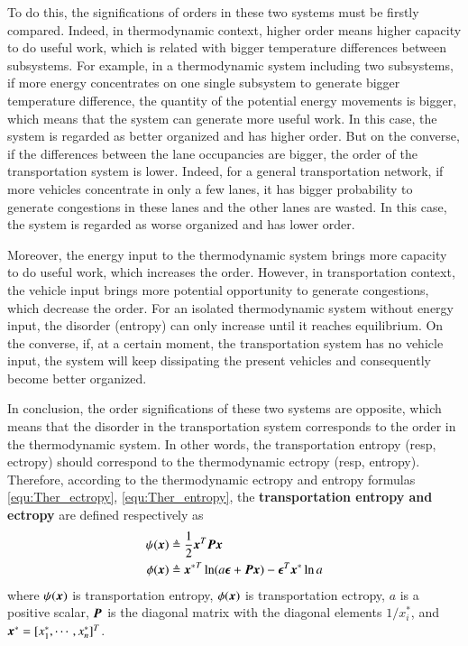 \documentclass[preprint,authoryear,12pt]{elsarticle}
\renewcommand{\vec}[1]{\mbox{\boldmath$#1$}}
\newcommand{\mat}[1]{\mbox{\boldmath$#1$}}
\begin{document}
To do this, the significations of orders in these two systems must be
firstly compared. Indeed, in thermodynamic context, higher order
means higher capacity to do useful work, which is related with bigger
temperature differences between subsystems. For example, in a
thermodynamic system including two subsystems, if more energy
concentrates on one single subsystem to generate bigger temperature
difference, the quantity of the potential energy movements is bigger,
which means that the system can generate more useful work. In this
case, the system is regarded as better organized and has higher
order. But on the converse, if the differences between the lane
occupancies are bigger, the order of the transportation system is
lower. Indeed, for a general transportation network, if more vehicles
concentrate in only a few lanes, it has bigger probability to
generate congestions in these lanes and the other lanes are wasted.
In this case, the system is regarded as worse organized and has lower
order.

Moreover, the energy input to the thermodynamic system brings more
capacity to do useful work, which increases the order. However, in
transportation context, the vehicle input brings more potential
opportunity to generate congestions, which decrease the order. For an
isolated thermodynamic system without energy input, the disorder
(entropy) can only increase until it reaches equilibrium. On the
converse, if, at a certain moment, the transportation system has no
vehicle input, the system will keep dissipating the present vehicles
and consequently become better organized.

In conclusion, the order significations of these two systems are
opposite, which means that the disorder in the transportation system
corresponds to the order in the thermodynamic system. In other words,
the transportation entropy (resp, ectropy) should correspond to the
thermodynamic ectropy (resp, entropy). Therefore, according to the
thermodynamic ectropy and entropy formulas \eqref{equ:Ther_ectropy},
\eqref{equ:Ther_entropy}, the \textbf{transportation entropy and
ectropy} are defined respectively as
\begin{align}
\label{equ:Tran_entropy}
\psi(\vec{x}) &\triangleq \frac{1}{2}\vec{x}^T \mat{P} \vec{x}\\
\phi(\vec{x}) &\triangleq{\vec{x}^*}^T \ln
(a\vec{\epsilon}+\mat{P}\vec{x}) -\vec{\epsilon}^T\vec{x}^*\ln a
\label{equ:Tran_ectropy}
\end{align}
where $\psi(\vec{x})$ is transportation entropy, $\phi(\vec{x})$ is
transportation ectropy, $a$ is a positive scalar, $\mat{P}$ is the
diagonal matrix with the diagonal elements $1/x_i^*$, and
$\vec{x}^*=[x_1^*,\cdots,x_n^*]^T$.
\end{document}
